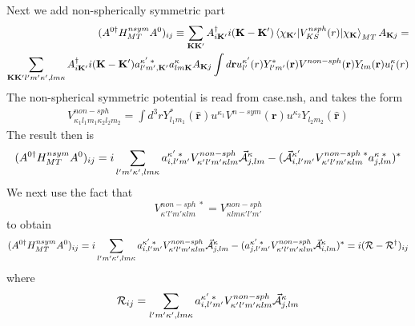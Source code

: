 \documentclass[aps,prb,floatfix,epsfig,singlecolumn,showpacs,preprintnumbers]{revtex4}
\renewcommand{\vr}{{\mathbf{r}}}
\newcommand{\vK}{{\mathbf{K}}}
\newcommand{\cR}{{\cal R}}
\newcommand{\vcA}{\vec{\cal A}}
\begin{document}
Next we add non-spherically symmetric part
\begin{eqnarray}
(A^{0\dagger} H_{MT}^{nsym} A^0)_{ij} \equiv
\sum_{\vK\vK'}A^\dagger_{i\vK'}i(\vK-\vK')\braket{\chi_{\vK'}|V_{KS}^{nsph}(r)|\chi_\vK}_{MT}A_{\vK j}=\\
\sum_{\vK\vK'l'm'\kappa',lm\kappa}A^\dagger_{i\vK'}i(\vK-\vK')  a^{\kappa'\;*}_{l'm',\vK'}
a_{lm\vK}^\kappa A_{\vK j}
\int d\vr u_{l'}^{\kappa'}(r) Y_{l'm'}^*(\vr) V^{non-sph}(\vr)Y_{lm}(\vr) u_l^\kappa(r)
\end{eqnarray}
The non-spherical symmetric potential is read from case.nsh, 
and takes the form
\begin{eqnarray}
V^{non-sph}_{\kappa_1 l_1 m_1 \kappa_2 l_2 m_2} = \int d^3 r Y^*_{l_1 m_1}(\hat{\vr}) u^{\kappa_1} V^{n-sym}(\vr) u^{\kappa_2}Y_{l_2 m_2}(\hat{\vr})
\end{eqnarray}
The result then is
\begin{eqnarray}
(A^{0\dagger} H_{MT}^{nsym} A^0)_{ij} =
i \sum_{l'm'\kappa',lm\kappa}
a^{\kappa'\;*}_{i, l'm'} V^{non-sph}_{\kappa' l' m' \kappa l m}  \vcA^\kappa_{j, lm}
-(\vcA^{\kappa'}_{i,l'm'} V^{non-sph\;*}_{\kappa' l' m' \kappa l m} a^{\kappa\;*}_{j,lm})^*
\end{eqnarray}
We next use the fact that
$$V^{non-sph\;*}_{\kappa' l' m' \kappa l m} =V^{non-sph}_{\kappa l m \kappa' l' m'} $$
to obtain 
\begin{eqnarray}
(A^{0\dagger} H_{MT}^{nsym} A^0)_{ij} =
i \sum_{l'm'\kappa',lm\kappa}
a^{\kappa'\;*}_{i, l'm'} V^{non-sph}_{\kappa' l' m' \kappa l m}  \vcA^\kappa_{j, lm}
-(a^{\kappa'\;*}_{j,l' m'} V^{non-sph}_{\kappa' l' m' \kappa l m} \vcA^{\kappa}_{i,lm})^*
=i(\cR-\cR^\dagger)_{ij}
\end{eqnarray}
where
\begin{eqnarray}
\cR_{ij}=\sum_{l'm'\kappa',lm\kappa} a^{\kappa'\;*}_{i, l'm'} V^{non-sph}_{\kappa' l' m' \kappa l m}  \vcA^\kappa_{j, lm}
\end{eqnarray}
\end{document}
